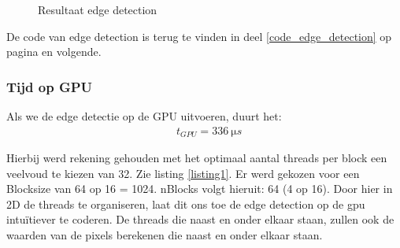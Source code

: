 \documentclass[11pt,twoside,a4paper]{article}
\begin{document}
\begin{figure}[h!]
    \centering
    \hfill
    \caption{Resultaat edge detection}
    \label{fig:edge_dection}
\end{figure}

De code van edge detection is terug te vinden in deel \ref{code_edge_detection} op pagina \pageref{code_edge_detection} en volgende.


\subsubsection{Tijd op GPU}

Als we de edge detectie op de GPU uitvoeren, duurt het:
\begin{align*}
    &t_{GPU} = \SI{336}{\micro s}
\end{align*}

Hierbij werd rekening gehouden met het optimaal aantal threads per block een veelvoud te kiezen van 32. Zie listing \ref{listing1}. Er werd gekozen voor een Blocksize van 64 op 16 = 1024. nBlocks volgt hieruit: 64 (4 op 16). Door hier in 2D de threads te organiseren, laat dit ons toe de edge detection op de gpu intu\"itiever te coderen. De threads die naast en onder elkaar staan, zullen ook de waarden van de pixels berekenen die naast en onder elkaar staan.
\end{document}
